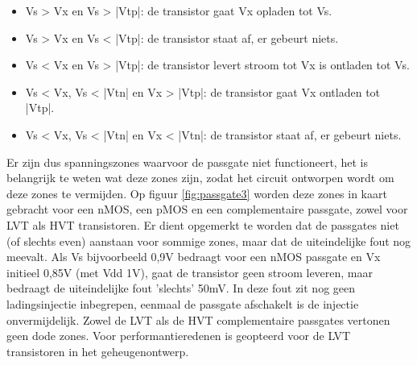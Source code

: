 \begin{itemize}
\item Vs > Vx en Vs > |Vtp|: de transistor gaat Vx opladen tot Vs.
\item Vs > Vx en Vs < |Vtp|: de transistor staat af, er gebeurt niets.
\item Vs < Vx en Vs > |Vtp|: de transistor levert stroom tot Vx is ontladen tot Vs.
\item Vs < Vx, Vs < |Vtn| en Vx > |Vtp|: de transistor gaat Vx ontladen tot |Vtp|.
\item Vs < Vx, Vs < |Vtn| en Vx < |Vtn|: de transistor staat af, er gebeurt niets.
\end{itemize}

Er zijn dus spanningszones waarvoor de passgate niet functioneert, het is belangrijk te weten wat deze zones zijn, zodat het circuit ontworpen wordt om deze zones te vermijden. 
Op figuur \ref{fig:passgate3} worden deze zones in kaart gebracht voor een nMOS, een pMOS en een complementaire passgate, zowel voor LVT als HVT transistoren. Er dient opgemerkt te worden dat de passgates niet (of slechts even) aanstaan voor sommige zones, maar dat de uiteindelijke fout nog meevalt.
Als Vs bijvoorbeeld 0,9V bedraagt voor een nMOS passgate en Vx initieel 0,85V (met Vdd 1V), gaat de transistor geen stroom leveren, maar bedraagt de uiteindelijke fout 'slechts' 50mV.
In deze fout zit nog geen ladingsinjectie inbegrepen, eenmaal de passgate afschakelt is de injectie onvermijdelijk.
Zowel de LVT als de HVT complementaire passgates vertonen geen dode zones. Voor performantieredenen is geopteerd voor de LVT transistoren in het geheugenontwerp.

